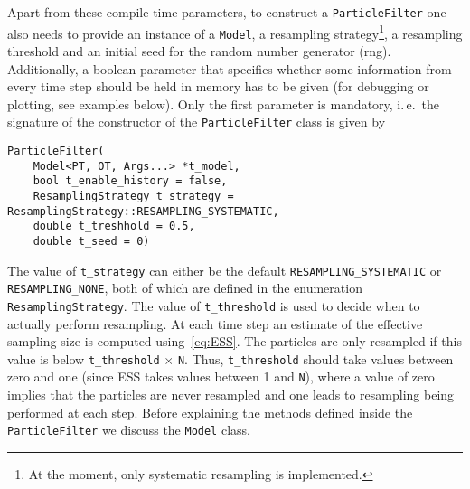 Apart from these compile-time parameters, to construct a
\texttt{ParticleFilter} one also needs to provide an instance of a
\texttt{Model}, a resampling strategy\footnote{At the moment, only
  systematic resampling is implemented.}, a resampling threshold and
an initial seed for the random number generator (rng). Additionally, a
boolean parameter that specifies whether some information from every
time step should be held in memory has to be given (\eg for debugging
or plotting, see examples below). Only the first parameter is
mandatory, i.\,e.\ the signature of the constructor of the
\texttt{ParticleFilter} class is given by
\begin{verbatim}
ParticleFilter(
    Model<PT, OT, Args...> *t_model,
    bool t_enable_history = false,
    ResamplingStrategy t_strategy = ResamplingStrategy::RESAMPLING_SYSTEMATIC,
    double t_treshhold = 0.5, 
    double t_seed = 0)
\end{verbatim}
The value of \texttt{t\_strategy} can either be the default
\texttt{RESAMPLING\_SYSTEMATIC} or \texttt{RESAMPLING\_NONE}, both of
which are defined in the enumeration \texttt{ResamplingStrategy}. The
value of \texttt{t\_threshold} is used to decide when to actually
perform resampling. At each time step an estimate of the effective
sampling size is computed using~\eqref{eq:ESS}. The particles are only
resampled if this value is below \texttt{t\_threshold} $\times$
\texttt{N}. Thus, \texttt{t\_threshold} should take values between
zero and one (since ESS takes values between 1 and \texttt{N}), where
a value of zero implies that the particles are never resampled and one
leads to resampling being performed at each step. Before explaining
the methods defined inside the \texttt{ParticleFilter} we discuss the
\texttt{Model} class.

